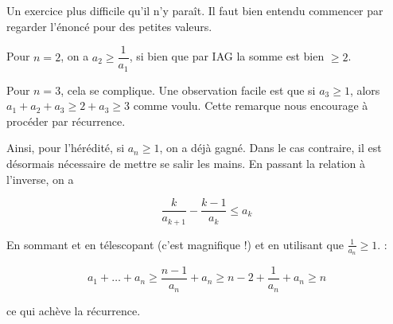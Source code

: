 \begin{sol}
Un exercice plus difficile qu'il n'y paraît. Il faut bien entendu commencer par regarder l'énoncé pour des petites valeurs. 

Pour $n=2$, on a $a_2\geqslant \dfrac1{a_1}$, si bien que par IAG la somme est bien $\geqslant 2$. 

Pour $n=3$, cela se complique. Une observation facile est que si $a_3\geqslant 1$, alors $a_1+a_2+a_3\geqslant 2+a_3 \geqslant 3$ comme voulu. Cette remarque nous encourage à procéder par récurrence. 

Ainsi, pour l'hérédité, si $a_n\geqslant 1$, on a déjà gagné. Dans le cas contraire, il est désormais nécessaire de mettre se salir les mains. En passant la relation à l'inverse, on a 

\[\frac{k}{a_{k+1}}- \frac{k-1}{a_k} \leqslant a_k\]

En sommant et en télescopant (c'est magnifique !) et en utilisant que $\frac1{a_n}\geqslant 1$. :

\[a_1+ \ldots + a_n \geqslant \frac{n-1}{a_n} + a_n \geqslant n-2 + \frac1{a_n}+a_n \geqslant n\] 

ce qui achève la récurrence. 
\end{sol}